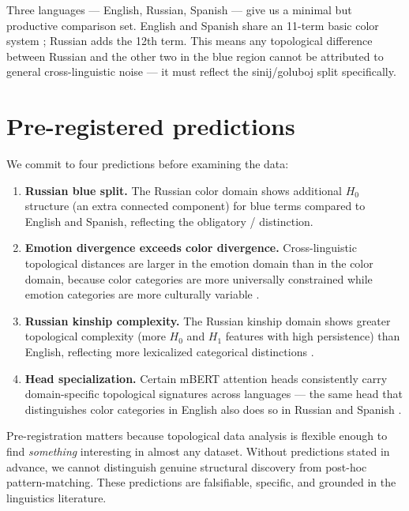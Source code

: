 Three languages --- English, Russian, Spanish --- give us a minimal but productive comparison set. English and Spanish share an 11-term basic color system \parencite{berlin1969, lillo2018}; Russian adds the 12th term. This means any topological difference between Russian and the other two in the blue region cannot be attributed to general cross-linguistic noise --- it must reflect the sinij/goluboj split specifically.

\section{Pre-registered predictions}

We commit to four predictions before examining the data:

\begin{enumerate}
  \item \textbf{Russian blue split.} The Russian color domain shows additional $H_0$ structure (an extra connected component) for blue terms compared to English and Spanish, reflecting the obligatory / distinction.

  \item \textbf{Emotion divergence exceeds color divergence.} Cross-linguistic topological distances are larger in the emotion domain than in the color domain, because color categories are more universally constrained \parencite{berlin1969} while emotion categories are more culturally variable \parencite{wierzbicka1999}.

  \item \textbf{Russian kinship complexity.} The Russian kinship domain shows greater topological complexity (more $H_0$ and $H_1$ features with high persistence) than English, reflecting more lexicalized categorical distinctions \parencite{friedrich1964}.

  \item \textbf{Head specialization.} Certain mBERT attention heads consistently carry domain-specific topological signatures across languages --- the same head that distinguishes color categories in English also does so in Russian and Spanish \parencite{clark2019}.
\end{enumerate}

Pre-registration matters because topological data analysis is flexible enough to find \emph{something} interesting in almost any dataset. Without predictions stated in advance, we cannot distinguish genuine structural discovery from post-hoc pattern-matching. These predictions are falsifiable, specific, and grounded in the linguistics literature.

